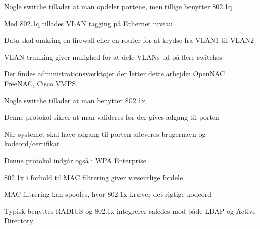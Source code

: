 

\begin{list1}
\item Nogle switche tillader at man opdeler portene, men tillige benytter 802.1q
\item Med 802.1q tillades VLAN tagging på Ethernet niveau
\item Data skal omkring en firewall eller en router for at krydse fra VLAN1 til VLAN2
\item VLAN trunking giver mulighed for at dele VLANs ud på flere switches
\item Der findes administrationsværktøjer der letter dette arbejde: OpenNAC FreeNAC, Cisco VMPS
\end{list1}







\begin{list1}
\item Nogle switche tillader at man benytter 802.1x
\item Denne protokol sikrer at man valideres før der gives adgang til porten
\item Når systemet skal have adgang til porten afleveres brugernavn og kodeord/certifikat
\item Denne protokol indgår også i WPA Enterprise
\end{list1}



\begin{list1}
\item 802.1x i forhold til MAC filtrering giver væsentlige fordele
\item MAC filtrering kan spoofes, hvor 802.1x kræver det rigtige kodeord
\item Typisk benyttes RADIUS og 802.1x integrerer således mod både LDAP og Active Directory
\end{list1}














